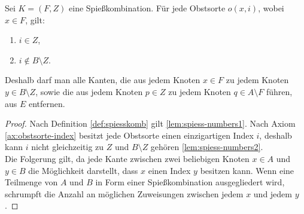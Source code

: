 \begin{lemma} \label{lem:spiess-numbers}
Sei $K = (F, Z)$ eine Spießkombination. Für jede Obstsorte $o(x, i)$, wobei $x \in F$, gilt:
\begin{enumerate}[label={\upshape(\roman*)}]
  \item $i \in Z$, \label{lem:spiess-numbers1}
  \item $i \notin B \setminus Z$. \label{lem:spiess-numbers2}
\end{enumerate}   
Deshalb darf man alle Kanten, die aus jedem Knoten $x \in F$ 
zu jedem Knoten $y \in B \setminus Z$, sowie die aus jedem Knoten $p \in Z$ zu
jedem Knoten $q \in A \setminus F$ führen, aus $E$ entfernen.
\end{lemma}

\begin{proof}
Nach Definition \ref{def:spiesskomb} gilt \ref{lem:spiess-numbers1}. 
Nach Axiom \ref{ax:obstsorte-index} besitzt jede Obstsorte einen einzigartigen Index $i$,
deshalb kann $i$ nicht gleichzeitig zu $Z$ und $B \setminus Z$ gehören \ref{lem:spiess-numbers2}.\\
Die Folgerung gilt, da %
jede Kante zwischen zwei beliebigen Knoten $x \in A$ und $y \in B$ die Möglichkeit darstellt,
dass $x$ einen Index $y$ besitzen kann.
Wenn eine Teilmenge von $A$ und $B$ in Form einer Spießkombination ausgegliedert wird,
schrumpft die Anzahl an möglichen Zuweisungen zwischen jedem $x$ und jedem $y$. 
\end{proof}